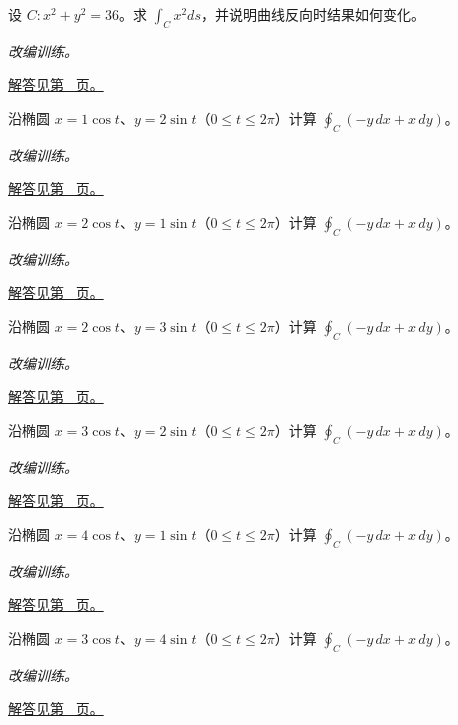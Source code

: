 \documentclass[12pt,fontset=fandol]{ctexart}
\begin{document}
\begin{example}[圆上的第一类曲线积分]\label{ex:c41q7}
设 $C:x^2+y^2=36$。求 $\displaystyle\int_Cx^2ds$，并说明曲线反向时结果如何变化。
\par\textit{改编训练。}\par\hyperref[ans:c41q7]{解答见第~\pageref{ans:c41q7} 页。}
\end{example}
\begin{example}[椭圆上的环流]\label{ex:c41q8}
沿椭圆 $x=1\cos t$、$y=2\sin t$（$0\le t\le2\pi$）计算 $\oint_C(-y\,dx+x\,dy)$。
\par\textit{改编训练。}\par\hyperref[ans:c41q8]{解答见第~\pageref{ans:c41q8} 页。}
\end{example}
\begin{example}[椭圆上的环流]\label{ex:c41q9}
沿椭圆 $x=2\cos t$、$y=1\sin t$（$0\le t\le2\pi$）计算 $\oint_C(-y\,dx+x\,dy)$。
\par\textit{改编训练。}\par\hyperref[ans:c41q9]{解答见第~\pageref{ans:c41q9} 页。}
\end{example}
\begin{example}[椭圆上的环流]\label{ex:c41q10}
沿椭圆 $x=2\cos t$、$y=3\sin t$（$0\le t\le2\pi$）计算 $\oint_C(-y\,dx+x\,dy)$。
\par\textit{改编训练。}\par\hyperref[ans:c41q10]{解答见第~\pageref{ans:c41q10} 页。}
\end{example}
\begin{example}[椭圆上的环流]\label{ex:c41q11}
沿椭圆 $x=3\cos t$、$y=2\sin t$（$0\le t\le2\pi$）计算 $\oint_C(-y\,dx+x\,dy)$。
\par\textit{改编训练。}\par\hyperref[ans:c41q11]{解答见第~\pageref{ans:c41q11} 页。}
\end{example}
\begin{example}[椭圆上的环流]\label{ex:c41q12}
沿椭圆 $x=4\cos t$、$y=1\sin t$（$0\le t\le2\pi$）计算 $\oint_C(-y\,dx+x\,dy)$。
\par\textit{改编训练。}\par\hyperref[ans:c41q12]{解答见第~\pageref{ans:c41q12} 页。}
\end{example}
\begin{example}[椭圆上的环流]\label{ex:c41q13}
沿椭圆 $x=3\cos t$、$y=4\sin t$（$0\le t\le2\pi$）计算 $\oint_C(-y\,dx+x\,dy)$。
\par\textit{改编训练。}\par\hyperref[ans:c41q13]{解答见第~\pageref{ans:c41q13} 页。}
\end{example}
\end{document}
